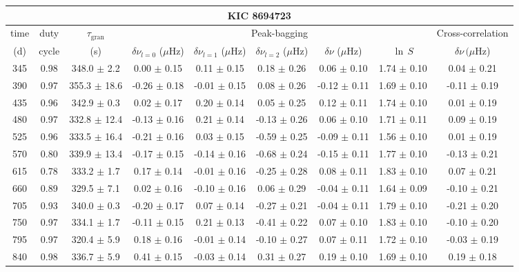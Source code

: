 \documentclass[twocolumn]{aastex61}%
\begin{document}
\begin{table*}[ht]\centering\fontsize{9.}{7.}\selectfont
\begin{tabular}{ccc|ccccc|c}
\multicolumn{9}{c}{KIC 8694723}\\ \hline\hline
time & duty & $\tau_\text{gran}$ &\multicolumn{5}{c|}{Peak-bagging}&Cross-correlation\\
(d)& cycle & (s)&$\delta\nu_{l=0}$ ($\mu$Hz) & $\delta\nu_{l=1}$ ($\mu$Hz) & $\delta\nu_{l=2}$ ($\mu$Hz) & $\delta\nu$ ($\mu$Hz)& $\ln\,S$ & $\delta\nu\,(\mu$Hz)\\\hline
345 & 0.98 & 348.0 $\pm$ 2.2 & 0.00 $\pm$ 0.15 & 0.11 $\pm$ 0.15 & 0.18 $\pm$ 0.26 & 0.06 $\pm$ 0.10 & 1.74 $\pm$ 0.10 & 0.04 $\pm$ 0.21\\
390 & 0.97 & 355.3 $\pm$ 18.6 & -0.26 $\pm$ 0.18 & -0.01 $\pm$ 0.15 & 0.08 $\pm$ 0.26 & -0.12 $\pm$ 0.11 & 1.69 $\pm$ 0.10 & -0.11 $\pm$ 0.19\\
435 & 0.96 & 342.9 $\pm$ 0.3 & 0.02 $\pm$ 0.17 & 0.20 $\pm$ 0.14 & 0.05 $\pm$ 0.25 & 0.12 $\pm$ 0.11 & 1.74 $\pm$ 0.10 & 0.01 $\pm$ 0.19\\
480 & 0.97 & 332.8 $\pm$ 12.4 & -0.13 $\pm$ 0.16 & 0.21 $\pm$ 0.14 & -0.13 $\pm$ 0.26 & 0.06 $\pm$ 0.10 & 1.71 $\pm$ 0.11 & 0.09 $\pm$ 0.19\\
525 & 0.96 & 333.5 $\pm$ 16.4 & -0.21 $\pm$ 0.16 & 0.03 $\pm$ 0.15 & -0.59 $\pm$ 0.25 & -0.09 $\pm$ 0.11 & 1.56 $\pm$ 0.10 & 0.01 $\pm$ 0.19\\
570 & 0.80 & 339.9 $\pm$ 13.4 & -0.17 $\pm$ 0.15 & -0.14 $\pm$ 0.16 & -0.68 $\pm$ 0.24 & -0.15 $\pm$ 0.11 & 1.77 $\pm$ 0.10 & -0.13 $\pm$ 0.21\\
615 & 0.78 & 333.2 $\pm$ 1.7 & 0.17 $\pm$ 0.14 & -0.01 $\pm$ 0.16 & -0.25 $\pm$ 0.28 & 0.08 $\pm$ 0.11 & 1.83 $\pm$ 0.10 & 0.07 $\pm$ 0.21\\
660 & 0.89 & 329.5 $\pm$ 7.1 & 0.02 $\pm$ 0.16 & -0.10 $\pm$ 0.16 & 0.06 $\pm$ 0.29 & -0.04 $\pm$ 0.11 & 1.64 $\pm$ 0.09 & -0.10 $\pm$ 0.21\\
705 & 0.93 & 340.0 $\pm$ 0.3 & -0.20 $\pm$ 0.17 & 0.07 $\pm$ 0.14 & -0.27 $\pm$ 0.21 & -0.04 $\pm$ 0.11 & 1.79 $\pm$ 0.10 & -0.21 $\pm$ 0.20\\
750 & 0.97 & 334.1 $\pm$ 1.7 & -0.11 $\pm$ 0.15 & 0.21 $\pm$ 0.13 & -0.41 $\pm$ 0.22 & 0.07 $\pm$ 0.10 & 1.83 $\pm$ 0.10 & -0.10 $\pm$ 0.20\\
795 & 0.97 & 320.4 $\pm$ 5.9 & 0.18 $\pm$ 0.16 & -0.01 $\pm$ 0.14 & -0.10 $\pm$ 0.27 & 0.07 $\pm$ 0.11 & 1.72 $\pm$ 0.10 & -0.03 $\pm$ 0.19\\
840 & 0.98 & 336.7 $\pm$ 5.9 & 0.41 $\pm$ 0.15 & -0.03 $\pm$ 0.14 & 0.31 $\pm$ 0.27 & 0.19 $\pm$ 0.10 & 1.69 $\pm$ 0.10 & 0.19 $\pm$ 0.18\\

\end{tabular}
\end{table*}
\end{document}
